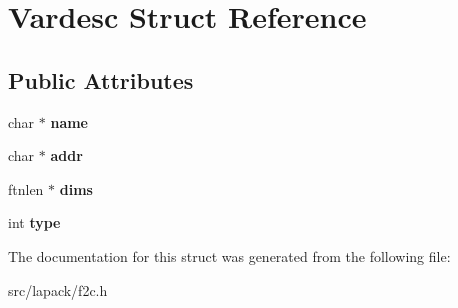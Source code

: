 \hypertarget{structVardesc}{\section{\-Vardesc \-Struct \-Reference}
\label{structVardesc}
}
\subsection*{\-Public \-Attributes}
\begin{DoxyCompactItemize}
\item 
\hypertarget{structVardesc_a9dcb9122e28bfb7d88caed2ffa38f1ad}{char $\ast$ {\bfseries name}}\label{structVardesc_a9dcb9122e28bfb7d88caed2ffa38f1ad}

\item 
\hypertarget{structVardesc_abc6f3753ac54741fafe32fcc744993ab}{char $\ast$ {\bfseries addr}}\label{structVardesc_abc6f3753ac54741fafe32fcc744993ab}

\item 
\hypertarget{structVardesc_a7be667d06905f6c6463ede740ed242ec}{ftnlen $\ast$ {\bfseries dims}}\label{structVardesc_a7be667d06905f6c6463ede740ed242ec}

\item 
\hypertarget{structVardesc_ac901f905f9cf2c9011684b7e612cc16c}{int {\bfseries type}}\label{structVardesc_ac901f905f9cf2c9011684b7e612cc16c}

\end{DoxyCompactItemize}


\-The documentation for this struct was generated from the following file\-:\begin{DoxyCompactItemize}
\item 
src/lapack/f2c.\-h\end{DoxyCompactItemize}
